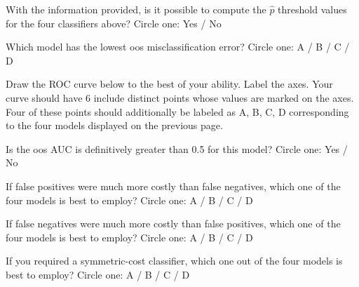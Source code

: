\documentclass[12pt]{article}
\begin{document}

 With the information provided, is it possible to compute the $\hat{p}$ threshold values for the four classifiers above? Circle one: Yes / No


 Which model has the lowest oos misclassification error? Circle one: A / B / C / D

 Draw the ROC curve below to the best of your ability. Label the axes. Your curve should have 6 include distinct points whose values are marked on the axes. Four of these points should additionally be labeled as A, B, C, D corresponding to the four models displayed on the previous page. 



 Is the oos AUC is definitively greater than 0.5 for this model? Circle one: Yes / No

 If false positives were much more costly than false negatives, which one of the four models is best to employ? Circle one: A / B / C / D

 If false negatives were much more costly than false positives, which one of the four models is best to employ? Circle one: A / B / C / D

 If you required a symmetric-cost classifier, which one out of the four models is best to employ? Circle one: A / B / C / D
\end{document}
